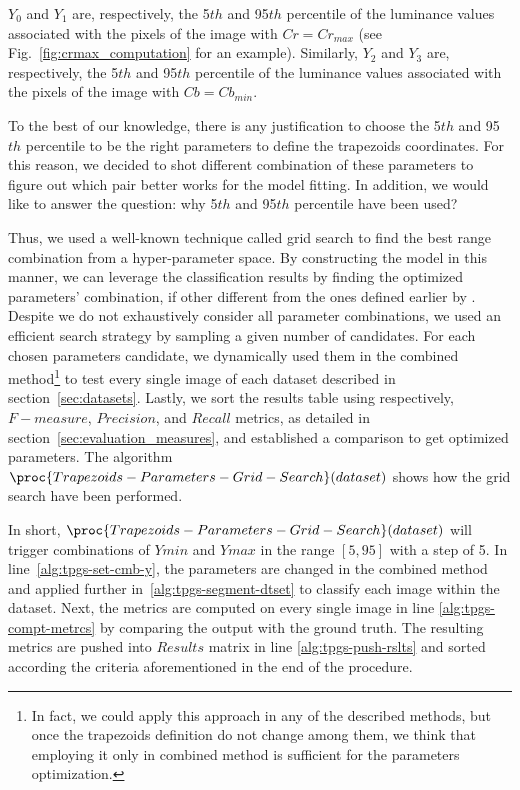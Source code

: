 $Y_0$ and $Y_1$ are, respectively, the 5${th}$ and 95$th$ percentile of the luminance values associated with the pixels of the image with $Cr = Cr_{max}$ (see Fig.~\ref{fig:crmax_computation} for an example). Similarly, $Y_2$ and $Y_3$ are, respectively, the 5${th}$ and 95$th$ percentile of the luminance values associated with the pixels of the image with $Cb = Cb_{min}$.

To the best of our knowledge, there is any justification to choose the 5${th}$ and 95$th$ percentile to be the right parameters to define the trapezoids coordinates. For this reason, we decided to shot different combination of these parameters to figure out which pair better works for the model fitting. In addition, we would like to answer the question: why 5${th}$ and 95$th$ percentile have been used?

Thus, we used a well-known technique called grid search to find the best range combination from a hyper-parameter space. By constructing the model in this manner, we can leverage the classification results by finding the optimized parameters' combination, if other different from the ones defined earlier by \citet{brancati:17}. Despite we do not exhaustively consider all parameter combinations, we used an efficient search strategy by sampling a given number of candidates. For each chosen parameters candidate, we dynamically used them in the combined method\footnote{In fact, we could apply this approach in any of the described methods, but once the trapezoids definition do not change among them, we think that employing it only in combined method is sufficient for the parameters optimization.} to test every single image of each dataset described in section~\ref{sec:datasets}. Lastly, we sort the results table using respectively, $F-measure$, $Precision$, and $Recall$ metrics, as detailed in section~\ref{sec:evaluation_measures}, and established a comparison to get optimized parameters. The algorithm $\proc{Trapezoids-Parameters-Grid-Search}(dataset)$ shows how the grid search have been performed.

In short, $\proc{Trapezoids-Parameters-Grid-Search}(dataset)$ will trigger combinations of $Ymin$ and $Ymax$ in the range $[5, 95]$ with a step of 5. In line~\ref{alg:tpgs-set-cmb-y}, the parameters are changed in the combined method and applied further in~\ref{alg:tpgs-segment-dtset} to classify each image within the dataset. Next, the metrics are computed on every single image in line \ref{alg:tpgs-compt-metrcs} by comparing the output with the ground truth. The resulting metrics are pushed into $Results$ matrix in line \ref{alg:tpgs-push-rslts} and sorted according the criteria aforementioned in the end of the procedure.

